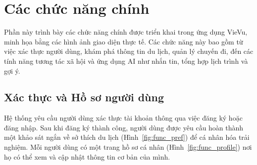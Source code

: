 \section{Các chức năng chính}
\label{sec:system_function}

\noindent Phần này trình bày các chức năng chính được triển khai trong ứng dụng VieVu, minh họa bằng các hình ảnh giao diện thực tế. Các chức năng này bao gồm từ việc xác thực người dùng, khám phá thông tin du lịch, quản lý chuyến đi, đến các tính năng tương tác xã hội và ứng dụng AI như nhắn tin, tổng hợp lịch trình và gợi ý.

\subsection{Xác thực và Hồ sơ người dùng}
\noindent Hệ thống yêu cầu người dùng xác thực tài khoản thông qua việc đăng ký hoặc đăng nhập. Sau khi đăng ký thành công, người dùng được yêu cầu hoàn thành một khảo sát ngắn về sở thích du lịch (Hình~\ref{fig:func_pref}) để cá nhân hóa trải nghiệm. Mỗi người dùng có một trang hồ sơ cá nhân (Hình~\ref{fig:func_profile}) nơi họ có thể xem và cập nhật thông tin cơ bản của mình.

